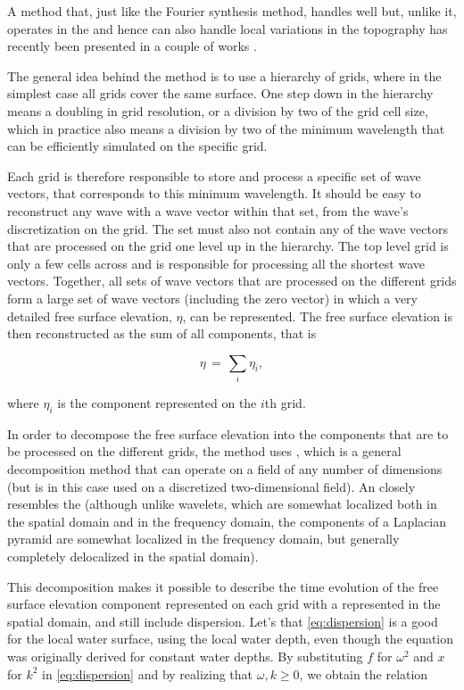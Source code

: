 A method that, just like the Fourier synthesis method, handles  well but, unlike it, operates in the  and hence can also handle local variations in the topography has recently been presented in a couple of works \citep{Ottosson2011,Lennartsson2012}.

The general idea behind the method is to use a hierarchy of grids, where in the simplest case all grids cover the same surface. One step down in the hierarchy means a doubling in grid resolution, or a division by two of the grid cell size, which in practice also means a division by two of the minimum wavelength that can be efficiently simulated on the specific grid.

Each grid is therefore responsible to store and process a specific set of wave vectors, that corresponds to this minimum wavelength. It should be easy to reconstruct any wave with a wave vector within that set, from the wave's discretization on the grid. The set must also not contain any of the wave vectors that are processed on the grid one level up in the hierarchy. The top level grid is only a few cells across and is responsible for processing all the shortest wave vectors. Together, all sets of wave vectors that are processed on the different grids form a large set of wave vectors (including the zero vector) in which a very detailed free surface elevation, $\eta$, can be represented. The free surface elevation is then reconstructed as the sum of all components, that is

\begin{equation} \label{eq:laplacian_pyramid_composition}
\eta \,=\, \sum_i \eta_i,
\end{equation}

where $\eta_i$ is the component represented on the $i$th grid.

In order to decompose the free surface elevation into the components that are to be processed on the different grids, the method uses \LPD, which is a general decomposition method that can operate on a field of any number of dimensions (but is in this case used on a discretized two-dimensional field). An \LPD closely resembles the  (although unlike wavelets, which are somewhat localized both in the spatial domain and in the frequency domain, the components of a Laplacian pyramid are somewhat localized in the frequency domain, but generally completely delocalized in the spatial domain).

This decomposition makes it possible to describe the time evolution of the free surface elevation component represented on each grid with a \PDE represented in the spatial domain, and still include dispersion. Let's \assume that \eqref{eq:dispersion} is a good \approximation for the local water surface, using the local water depth, even though the equation was originally derived for constant water depths. By substituting $f$ for $\omega^2$ and $x$ for $k^2$ in \eqref{eq:dispersion} and by realizing that $\omega, k \geq 0$, we obtain the relation

